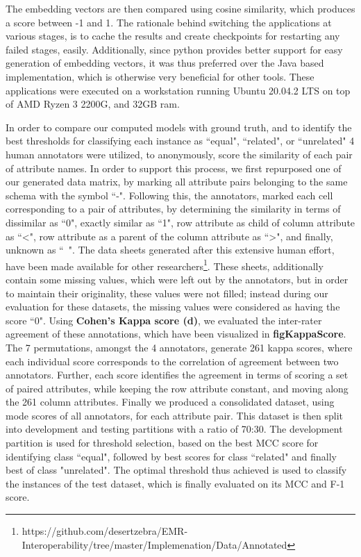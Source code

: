The embedding vectors are then compared using cosine similarity, which produces a score between -1 and 1.
The rationale behind switching the applications at various stages, is to cache the results and create checkpoints for restarting any failed stages, easily. Additionally, since python provides better support for easy generation of embedding vectors, it was thus preferred over the Java based implementation, which is otherwise very beneficial for other tools. These applications were executed on a workstation running Ubuntu 20.04.2 LTS on top of AMD Ryzen 3 2200G, and 32GB ram.

In order to compare our computed models with ground truth, and to identify the best thresholds for classifying each instance as ``equal", ``related", or ``unrelated" 4 human annotators were utilized, to anonymously, score the similarity of each pair of attribute names. In order to support this process, we first repurposed one of our generated data matrix, by marking all attribute pairs belonging to the same schema with the symbol ``-". Following this, the annotators, marked each cell corresponding to a pair of attributes, by determining the similarity in terms of dissimilar as ``0", exactly similar as ``1", row attribute as child of column attribute as ``<", row attribute as a parent of the column attribute as ``>", and finally, unknown as ``~". The data sheets generated after this extensive human effort, have been made available for other researchers\footnote{https://github.com/desertzebra/EMR-Interoperability/tree/master/Implemenation/Data/Annotated}. These sheets, additionally contain some missing values, which were left out by the annotators, but in order to maintain their originality, these values were not filled; instead during our evaluation for these datasets, the missing values were considered as having the score ``0". Using \textbf{Cohen's Kappa score (d)}, we evaluated the inter-rater agreement of these annotations, which have been visualized in \textbf{figKappaScore}. The 7 permutations, amongst the 4 annotators, generate 261 kappa scores, where each individual score corresponds to the correlation of agreement between two annotators. Further, each score identifies the agreement in terms of scoring a set of paired attributes, while keeping the row attribute constant, and moving along the 261 column attributes. Finally we produced a consolidated dataset, using mode scores of all annotators, for each attribute pair. This dataset is then split into development and testing partitions with a ratio of 70:30. The development partition is used for threshold selection, based on the best MCC score for identifying class ``equal", followed by best scores for class ``related" and finally best of class "unrelated". The optimal threshold thus achieved is used to classify the instances of the test dataset, which is finally evaluated on its MCC and F-1 score.

